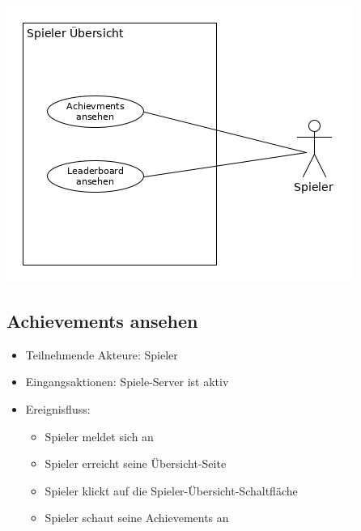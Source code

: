 \documentclass[a4paper]{scrreprt}
\begin{document}
\newpage
    \includegraphics[width=\textwidth]{uml/export/Spieler_Ubersicht.png}
	    \subsection{Achievements ansehen}
    \begin{itemize}
        \item Teilnehmende Akteure: \Gls{Spieler}
        \item Eingangsaktionen: Spiele-Server ist aktiv
        \item Ereignisfluss:
        \begin{itemize}
            \item \Gls{Spieler} meldet sich an
            \item \Gls{Spieler} erreicht seine Übersicht-Seite
            \item \Gls{Spieler} klickt auf die Spieler-Übersicht-Schaltfläche
            \item \Gls{Spieler} schaut seine Achievements an
        \end{itemize}
    \end{itemize}
\end{document}
